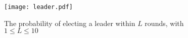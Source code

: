   \begin{figure}[h]
      \centering
      \texttt{[image: leader.pdf]}	
      \caption{The probability of electing a leader within $L$ rounds, with $1 \leq L \leq 10$}
      \label{leader-res}
      \end{figure}
\begin{comment}
\subsection{Problems}
\label{sec:problems}
While testing our choreographic language, we noticed that some of the case studies presented in the 
PRISM documentation \cite{PRISMdoc} cannot be modeled by using our language.
The reasons are various, in this section we try to outline the problems.

\begin{itemize}
\item \textbf{Asynchronous Leader Election}\footnote{\url{https://www.prismmodelchecker.org/casestudies/asynchronous_leader.php}}:
 processes synchronize with the same label but the conditions are different.
 We include in our language the \texttt{it-then-else} statement but we do not allow 
 the \texttt{if-then} (without the \texttt{else}). This is done because in this way, we do not 
 incur in deadlock states.
\item  \textbf{Probabilistic Broadcast Protocols}\footnote{\url{https://www.prismmodelchecker.org/casestudies/prob_broadcast.php}}:
 also in this case, the problem are the labels of the synchronizations.
 In fact, all the processes synchornize with the same label on every actions.
 This is not possible in our language, since a label is unique for every synchronization between two (or more) processes.
\item \textbf{Cyclic Server Polling System}\footnote{\url{https://www.prismmodelchecker.org/casestudies/polling.php}}:
 in this model, the processes \texttt{station$_i$} do two different things in the same state.
 More precicely, at the state 0 (\texttt{s$_i$=0}), the processes may synchornize with the process
 \texttt{server} or may change their state without any synchronization.
 In out language, this cannot be formalized since the synchronization is a branch action,
 so there should be another option with a synchronization.


\end{itemize}
\end{comment}




